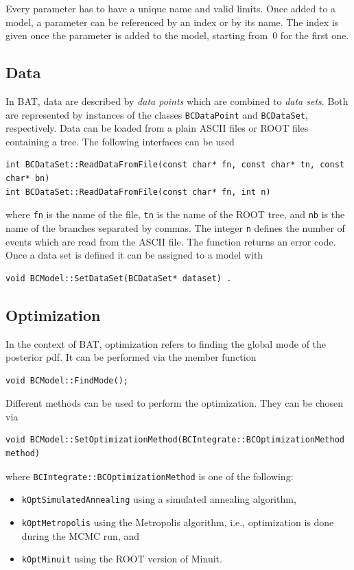 \documentclass[11pt, a4paper]{article}
\begin{document}
Every parameter has to have a unique name and valid limits. Once added
to a model, a parameter can be referenced by an index or by its
name. The index is given once the parameter is added to the model,
starting from~0 for the first one. 

\subsection{Data}

In {\sc BAT}, data are described by {\it data points} which are
combined to {\it data sets}. Both are represented by instances of the
classes \verb|BCDataPoint| and \verb|BCDataSet|, respectively.  Data
can be loaded from a plain ASCII files or ROOT files containing a
tree. The following interfaces can be used 
%
\begin{verbatim}
int BCDataSet::ReadDataFromFile(const char* fn, const char* tn, const char* bn)
int BCDataSet::ReadDataFromFile(const char* fn, int n)
\end{verbatim} 
%
\noindent 
where \verb|fn| is the name of the file, \verb|tn| is the name of the
ROOT tree, and \verb|nb| is the name of the branches separated by
commas. The integer \verb|n| defines the number of events which are
read from the ASCII file. The function returns an error code. Once a
data set is defined it can be assigned to a model with
%
\begin{verbatim}
void BCModel::SetDataSet(BCDataSet* dataset) .
\end{verbatim} 

\subsection{Optimization}

In the context of {\sc BAT}, optimization refers to finding the global
mode of the posterior pdf. It can be performed via the member function 
%
\begin{verbatim}
void BCModel::FindMode(); 
\end{verbatim}

Different methods can be used to perform the optimization. They can be
chosen via 
%
\begin{verbatim}
void BCModel::SetOptimizationMethod(BCIntegrate::BCOptimizationMethod method)
\end{verbatim}
%
\noindent
where \verb|BCIntegrate::BCOptimizationMethod| is one of the
following:
%
\begin{itemize}
\item \verb|kOptSimulatedAnnealing| using a simulated annealing
  algorithm,
\item \verb|kOptMetropolis| using the Metropolis algorithm, i.e.,
  optimization is done during the MCMC run, and 
\item \verb|kOptMinuit| using the ROOT version of Minuit. 
\end{itemize}
\end{document}
